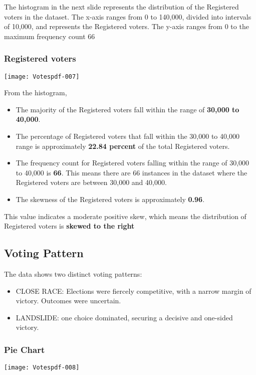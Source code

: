 \documentclass[fleqn,a4paper,12pt]{article}
\begin{document}
The histogram in the next slide represents the distribution of the Registered voters in the dataset. The x-axis ranges from 0 to 140,000, divided into intervals of 10,000, and represents the Registered voters. The y-axis ranges from 0 to the maximum frequency count 66


\subsubsection{Registered voters}
 
\texttt{[image: Votespdf-007]}


From the histogram, 
\begin{itemize}
\item The majority of the Registered voters fall within the range of \textbf{30,000 to 40,000}.
\item The percentage of Registered voters that fall within the 30,000 to 40,000 range is approximately \textbf{22.84 percent} of the total Registered voters.
\item The frequency count for Registered voters falling within the range of 30,000 to 40,000 is \textbf{66}. This means there are 66 instances in the dataset where the Registered voters are between 30,000 and 40,000.
\item The skewness of the Registered voters is approximately \textbf{0.96}.
\end{itemize}
This value indicates a moderate positive skew, which means the distribution of Registered voters is \textbf{skewed to the right}
 
\subsection{Voting Pattern}

The data shows two distinct voting patterns:

\begin{itemize}
\item CLOSE RACE: Elections were fiercely competitive, with a narrow margin of victory. Outcomes were uncertain.
\item LANDSLIDE: one choice dominated, securing a decisive and one-sided victory.
\end{itemize}

\subsubsection{Pie Chart}

\texttt{[image: Votespdf-008]}
 
\end{document}
